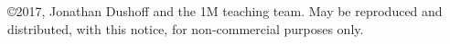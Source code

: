 \copyright 2017, Jonathan Dushoff and the 1M teaching team.  May be reproduced and distributed, with this notice, for non-commercial purposes only.
